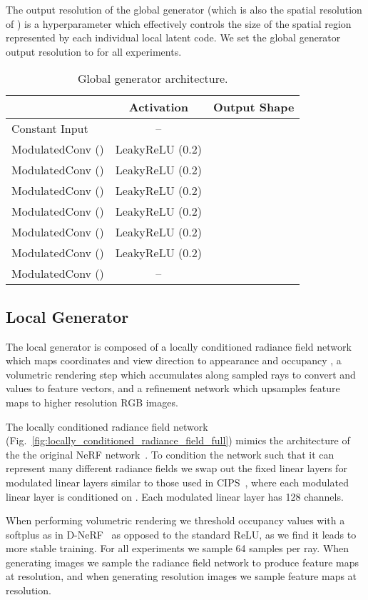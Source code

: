 \documentclass[10pt,twocolumn,letterpaper]{article}
\begin{document}
The output resolution of the global generator (which is also the spatial resolution of ) is a hyperparameter which effectively controls the size of the spatial region represented by each individual local latent code. We set the global generator output resolution to  for all experiments.

\begin{table}[h]
	\small
	\centering
	\begin{tabular}{lcc}
		\toprule
		& Activation & Output Shape \\
		\midrule
		Constant Input & -- &  \\
		ModulatedConv () & LeakyReLU (0.2) &  \\
		ModulatedConv () & LeakyReLU (0.2) &  \\
		ModulatedConv () & LeakyReLU (0.2) &  \\
		ModulatedConv () & LeakyReLU (0.2) &  \\
		ModulatedConv () & LeakyReLU (0.2) &  \\
		ModulatedConv () & LeakyReLU (0.2) &  \\
		ModulatedConv () & -- &  \\
		\bottomrule
	\end{tabular}
	\caption{Global generator architecture.}
	\label{tab:global_generator_architecture}
\end{table}

\subsection{Local Generator}

The local generator is composed of a locally conditioned radiance field network which maps coordinates and view direction to appearance  and occupancy , a volumetric rendering step which accumulates along sampled rays to convert  and  values to feature vectors, and a refinement network which upsamples feature maps to higher resolution RGB images.

The locally conditioned radiance field network (Fig.~\ref{fig:locally_conditioned_radiance_field_full}) mimics the architecture of the the original NeRF network~\cite{nerf}. To condition the network such that it can represent many different radiance fields we swap out the fixed linear layers for modulated linear layers similar to those used in CIPS~\cite{modfc}, where each modulated linear layer is conditioned on . Each modulated linear layer has 128 channels.

When performing volumetric rendering we threshold occupancy values  with a softplus as in D-NeRF~\cite{nerfies} as opposed to the standard ReLU, as we find it leads to more stable training. For all experiments we sample 64 samples per ray. When generating  images we sample the radiance field network to produce feature maps at  resolution, and when generating  resolution images we sample feature maps at  resolution.
\end{document}
